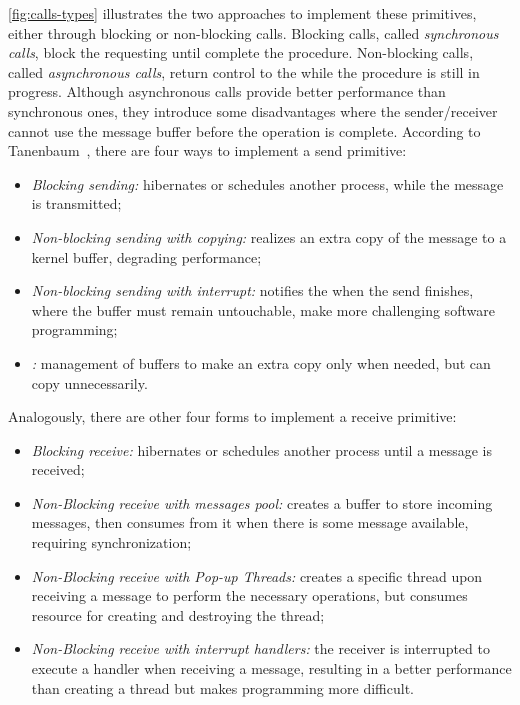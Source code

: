			\autoref{fig:calls-types} illustrates the two approaches to implement
			these primitives, either through blocking or non-blocking calls.
			Blocking calls, called \textit{synchronous calls}, block the requesting \cpu
			until complete the procedure.
			Non-blocking calls, called \textit{asynchronous calls}, return control to the
			\cpu while the procedure is still in progress.
			Although asynchronous calls provide better performance than
			synchronous ones, they introduce some disadvantages where the sender/receiver
			cannot use the message buffer before the operation is complete.
			According to Tanenbaum~\cite{tanenbaum:4ed}, there are four ways to implement
			a send primitive:
			\begin{itemize}
				\item \textit{Blocking sending:} \cpu hibernates or schedules another
					process, while the message is transmitted;
				\item \textit{Non-blocking sending with copying:} realizes an extra copy of
					the message to a kernel buffer, degrading performance;
				\item \textit{Non-blocking sending with interrupt:} notifies the \cpu
					when the send finishes, where the buffer must remain untouchable,
					make more challenging software programming;
				\item \textit{\cow:} management of buffers to make an extra copy only
					when needed, but can copy unnecessarily.
			\end{itemize}

			Analogously, there are other four forms to implement a receive primitive:
			\begin{itemize}
				\item \textit{Blocking receive:} \cpu hibernates or schedules another
					process until a message is received;
				\item \textit{Non-Blocking receive with messages pool:} \cpu creates
					a buffer to store incoming messages, then consumes from it when
					there is some message available, requiring synchronization;
				\item \textit{Non-Blocking receive with Pop-up Threads:} creates a specific
					thread upon receiving a message to perform the necessary operations,
					but consumes resource for creating and destroying the thread;
				\item \textit{Non-Blocking receive with interrupt handlers:} the receiver
					is interrupted to execute a handler when receiving a message, resulting
					in a better performance than creating a thread but
					makes programming more difficult.
			\end{itemize}

